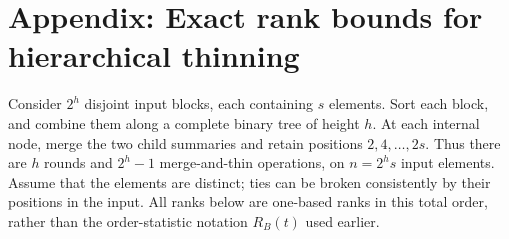 \section{Appendix: Exact rank bounds for hierarchical thinning}

Consider $2^h$ disjoint input blocks, each containing $s$ elements.
Sort each block, and combine them along a complete binary tree of
height $h$. At each internal node, merge the two child summaries and
retain positions $2,4,\ldots,2s$. Thus there are $h$ rounds and
$2^h-1$ merge-and-thin operations, on $n=2^h s$ input elements.
Assume that the elements are distinct; ties can be broken consistently
by their positions in the input. All ranks below are one-based ranks
in this total order, rather than the order-statistic notation $R_B(t)$
used earlier.

